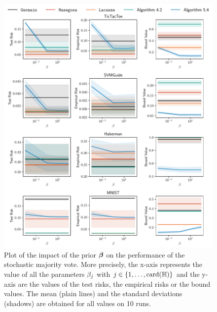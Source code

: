 \begin{noaddcontents}
\begin{figure}
    \centering
    \includegraphics[width=\textwidth]{chapter_5/figures/prior_2.pdf}
    \caption{
    Plot of the impact of the prior $\boldsymbol{\beta}$ on the performance of the stochastic majority vote.
    More precisely, the x-axis represents the value of all the parameters $\beta_j$ with $j\in\{1,\dots,\operatorname{card}(\mathbb{H})\}$ and the y-axis are the values of the test risks, the empirical risks or the bound values.
    The mean (plain lines) and the standard deviations (shadows) are obtained for all values on 10 runs.
    }
    \label{ap:mv-sto:fig:prior-2}
\end{figure}


\end{noaddcontents}
